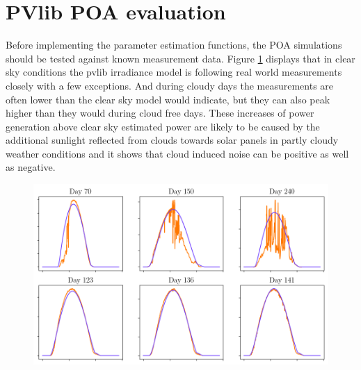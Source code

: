 \newpage
\section{PVlib POA evaluation}

Before implementing the parameter estimation functions, the POA simulations should be tested against known measurement data. Figure \ref{fig-multidaypoavsmeasurements} displays that in clear sky conditions the pvlib irradiance model is following real world measurements closely with a few exceptions. And during cloudy days the measurements are often lower than the clear sky model would indicate, but they can also peak higher than they would during cloud free days. These increases of power generation above clear sky estimated power are likely to be caused by the additional sunlight reflected from clouds towards solar panels in partly cloudy weather conditions and it shows that cloud induced noise can be positive as well as negative. 



\begin{figure}[h]
\centering
\includegraphics[width=0.9\linewidth]{pics/multiday_vs_neat}
\label{fig-multidaypoavsmeasurements}
\end{figure}



